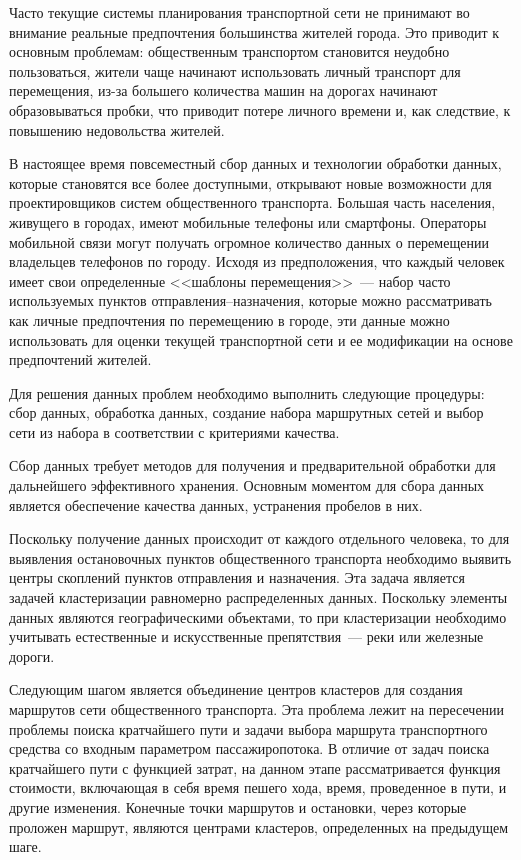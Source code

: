 Часто текущие системы планирования транспортной сети не принимают во внимание реальные предпочтения большинства жителей города. Это приводит к основным проблемам: общественным транспортом становится неудобно пользоваться, жители чаще начинают использовать личный транспорт для перемещения, из-за большего количества машин на дорогах начинают образовываться пробки, что приводит потере личного времени и, как следствие, к повышению недовольства жителей.

В настоящее время повсеместный сбор данных и технологии обработки данных, которые становятся все более доступными, открывают новые возможности для проектировщиков систем общественного транспорта. Большая часть населения, живущего в городах, имеют мобильные телефоны или смартфоны. Операторы мобильной связи могут получать огромное количество данных о перемещении владельцев телефонов по городу. Исходя из предположения, что каждый человек имеет свои определенные <<шаблоны перемещения>>~--- набор часто используемых пунктов отправления–назначения, которые можно рассматривать как личные предпочтения по перемещению в городе, эти данные можно использовать для оценки текущей транспортной сети и ее модификации на основе предпочтений жителей.

Для решения данных проблем необходимо выполнить следующие процедуры: сбор данных, обработка данных, создание набора маршрутных сетей и выбор сети из набора в соответствии с критериями качества.

Сбор данных требует методов для получения и предварительной обработки для дальнейшего эффективного хранения. Основным моментом для сбора данных является обеспечение качества данных, устранения пробелов в них.

Поскольку получение данных происходит от каждого отдельного человека, то для выявления остановочных пунктов общественного транспорта необходимо выявить центры скоплений пунктов отправления и назначения. Эта задача является задачей кластеризации равномерно распределенных данных. Поскольку элементы данных являются географическими объектами, то при кластеризации необходимо учитывать естественные и искусственные препятствия~--- реки или железные дороги.

Следующим шагом является объединение центров кластеров для создания маршрутов сети общественного транспорта. Эта проблема лежит на пересечении проблемы поиска кратчайшего пути и задачи выбора маршрута транспортного средства со входным параметром пассажиропотока. В отличие от задач поиска кратчайшего пути с функцией затрат, на данном этапе рассматривается функция стоимости, включающая в себя время пешего хода, время, проведенное в пути, и другие изменения. Конечные точки маршрутов и остановки, через которые проложен маршрут, являются центрами кластеров, определенных на предыдущем шаге.

